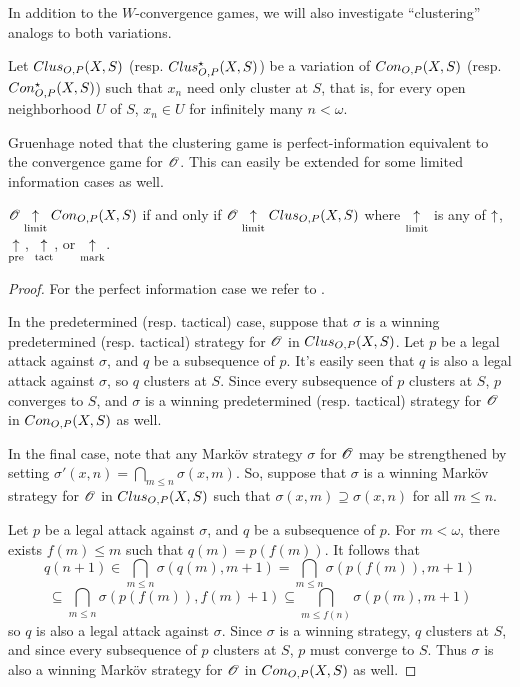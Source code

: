 In addition to the $W$-convergence games, we will also investigate
``clustering'' analogs to both variations.

\begin{game}
  Let $Clus_{O,P}(X,S)$ (resp. $Clus_{O,P}^\star(X,S)$) be a variation of
  $Con_{O,P}(X,S)$ (resp. $Con_{O,P}^\star(X,S)$) such that $x_n$ need only
  cluster at $S$, that is, for every open neighborhood $U$ of $S$, $x_n\in U$
  for infinitely many $n<\omega$.
\end{game}

Gruenhage noted that the clustering game is
perfect-information equivalent to the convergence game for $\mathscr{O}$. This
can easily be extended for some limited information cases as well.

\begin{prop}
  $\mathscr{O} \underset{\text{limit}}{\uparrow} Con_{O,P}(X,S)$
    if and only if
  $\mathscr{O} \underset{\text{limit}}{\uparrow} Clus_{O,P}(X,S)$
  where $\underset{\text{limit}}{\uparrow}$ is any of $\uparrow$, $\underset{\text{pre}}{\uparrow}$, $\underset{\text{tact}}{\uparrow}$, or $\underset{\text{mark}}{\uparrow}$.
\end{prop}

\begin{proof}
  For the perfect information case we refer to \cite{MR0413049}.

  In the predetermined (resp. tactical) case, suppose that $\sigma$ is a
  winning predetermined (resp. tactical) strategy for $\mathscr{O}$ in
  $Clus_{O,P}(X,S)$. Let $p$ be a legal attack against $\sigma$, and $q$ be a
  subsequence of $p$. It's easily seen that $q$ is also a legal attack against
  $\sigma$, so $q$ clusters at $S$. Since every subsequence of $p$ clusters
  at $S$, $p$ converges to $S$, and $\sigma$ is a winning predetermined
  (resp. tactical) strategy for $\mathscr{O}$ in $Con_{O,P}(X,S)$ as well.

  In the final case, note that any Mark\"ov strategy $\sigma$ for $\mathscr{O}$ may be
  strengthened by setting $\sigma'(x,n)=\bigcap_{m\leq n}\sigma(x,m)$.
  So, suppose that $\sigma$ is a winning Mark\"ov strategy for $\mathscr{O}$ in
  $Clus_{O,P}(X,S)$ such that $\sigma(x,m)\supseteq\sigma(x,n)$ for all
  $m\leq n$.

  Let $p$ be a legal attack against $\sigma$, and $q$ be a subsequence of $p$.
  For $m<\omega$, there exists $f(m)\leq m$ such that $q(m)=p(f(m))$. It follows
  that
    \[
      q(n+1)
        \in
      \bigcap_{m\leq n}\sigma(q(m),m+1)
        =
      \bigcap_{m\leq n}\sigma(p(f(m)),m+1)
    \]
    \[
        \subseteq
      \bigcap_{m\leq n}\sigma(p(f(m)),f(m)+1)
        \subseteq
      \bigcap_{m\leq f(n)}\sigma(p(m),m+1)
    \]
  so $q$ is also a legal attack against $\sigma$. Since $\sigma$ is a winning
  strategy, $q$ clusters at $S$, and since every subsequence of $p$ clusters
  at $S$, $p$ must converge to $S$. Thus $\sigma$ is also a winning Mark\"ov
  strategy for $\mathscr{O}$ in $Con_{O,P}(X,S)$ as well.
\end{proof}

